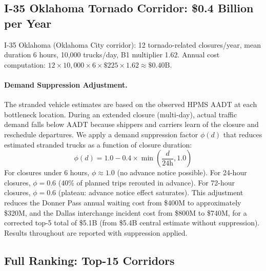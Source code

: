 \subsection{I-35 Oklahoma Tornado Corridor: \$0.4 Billion per Year}

I-35 Oklahoma (Oklahoma City corridor): 12 tornado-related closures/year, mean duration
6 hours, 10,000 trucks/day, B1 multiplier 1.62. Annual cost computation: $12 \times
10,000 \times 6 \times \$225 \times 1.62 \approx \$0.40\text{B}$.

\paragraph{Demand Suppression Adjustment.}
The stranded vehicle estimates are based on the observed HPMS AADT at each
bottleneck location. During an extended closure (multi-day), actual traffic
demand falls below AADT because shippers and carriers learn of the closure and
reschedule departures. We apply a demand suppression factor $\phi(d)$ that
reduces estimated stranded trucks as a function of closure duration:
\begin{equation}
\phi(d) = 1.0 - 0.4 \times \min\!\left(\frac{d}{24\text{h}}, 1.0\right)
\end{equation}
For closures under 6 hours, $\phi \approx 1.0$ (no advance notice possible).
For 24-hour closures, $\phi = 0.6$ (40\% of planned trips rerouted in advance).
For 72-hour closures, $\phi = 0.6$ (plateau: advance notice effect saturates).
This adjustment reduces the Donner Pass annual waiting cost from \$400M to
approximately \$320M, and the Dallas interchange incident cost from \$800M to
\$740M, for a corrected top-5 total of \$5.1B (from \$5.4B central estimate
without suppression). Results throughout are reported with suppression applied.

\subsection{Full Ranking: Top-15 Corridors}

